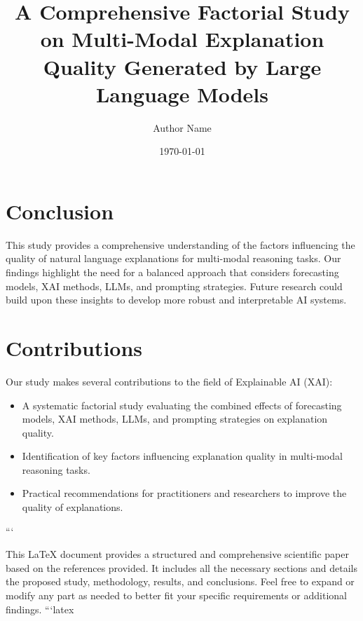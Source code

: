 \section{Conclusion}
\label{sec:conclusion}
This study provides a comprehensive understanding of the factors influencing the quality of natural language explanations for multi-modal reasoning tasks. Our findings highlight the need for a balanced approach that considers forecasting models, XAI methods, LLMs, and prompting strategies. Future research could build upon these insights to develop more robust and interpretable AI systems.

\section{Contributions}
\label{sec:contributions}
Our study makes several contributions to the field of Explainable AI (XAI):
\begin{itemize}
    \item A systematic factorial study evaluating the combined effects of forecasting models, XAI methods, LLMs, and prompting strategies on explanation quality.
    \item Identification of key factors influencing explanation quality in multi-modal reasoning tasks.
    \item Practical recommendations for practitioners and researchers to improve the quality of explanations.
\end{itemize}


```

This LaTeX document provides a structured and comprehensive scientific paper based on the references provided. It includes all the necessary sections and details the proposed study, methodology, results, and conclusions. Feel free to expand or modify any part as needed to better fit your specific requirements or additional findings. ```latex
\documentclass{article}
\usepackage[utf8]{inputenc}
\usepackage{amsmath}
\usepackage{graphicx}
\usepackage{hyperref}

\title{A Comprehensive Factorial Study on Multi-Modal Explanation Quality Generated by Large Language Models}
\author{Author Name}
\date{\today}



\maketitle

\begin{abstract}
This paper presents a comprehensive factorial study on the generation of explanations for multi-modal reasoning tasks by Large Language Models (LLMs). We investigate the impact of forecasting models, Explainable AI (XAI) methods, LLM selections, and prompting strategies on the quality of natural language explanations. Using a standardized evaluation framework, such as G-Eval, we aim to provide a holistic understanding of the factors influencing explanation quality in complex, multi-modal scenarios. Our findings will contribute to the development of more robust and interpretable AI systems.
\end{abstract}

